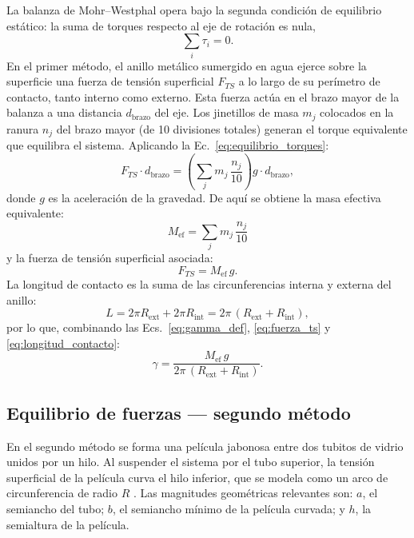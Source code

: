 La balanza de Mohr--Westphal opera bajo la segunda condición de equilibrio
estático: la suma de torques respecto al eje de rotación es nula,
\begin{equation}
    \sum_{i} \tau_i = 0.
    \label{eq:equilibrio_torques}
\end{equation}
En el primer método, el anillo metálico sumergido en agua ejerce sobre la
superficie una fuerza de tensión superficial $F_{TS}$ a lo largo de su
perímetro de contacto, tanto interno como externo. Esta fuerza actúa en el
brazo mayor de la balanza a una distancia $d_{\text{brazo}}$ del eje. Los
jinetillos de masa $m_j$ colocados en la ranura $n_j$ del brazo mayor (de 10
divisiones totales) generan el torque equivalente que equilibra el sistema.
Aplicando la Ec.~\eqref{eq:equilibrio_torques}:
\begin{equation}
    F_{TS} \cdot d_{\text{brazo}} =
    \left(\sum_{j} m_j \,\frac{n_j}{10}\right) g \cdot d_{\text{brazo}},
    \label{eq:torque_balance}
\end{equation}
donde $g$ es la aceleración de la gravedad. De aquí se obtiene la masa efectiva equivalente:
\begin{equation}
    M_{\text{ef}} = \sum_{j} m_j \,\frac{n_j}{10}
    \label{eq:masa_ef}
\end{equation}
y la fuerza de tensión superficial asociada:
\begin{equation}
    F_{TS} = M_{\text{ef}}\, g.
    \label{eq:fuerza_ts}
\end{equation}
La longitud de contacto es la suma de las circunferencias interna y externa del
anillo:
\begin{equation}
    L = 2\pi R_{\text{ext}} + 2\pi R_{\text{int}}
      = 2\pi\,(R_{\text{ext}} + R_{\text{int}}),
    \label{eq:longitud_contacto}
\end{equation}
por lo que, combinando las Ecs.~\eqref{eq:gamma_def},
\eqref{eq:fuerza_ts} y \eqref{eq:longitud_contacto}:
\begin{equation}
    \gamma = \frac{M_{\text{ef}}\,g}{2\pi\,(R_{\text{ext}} + R_{\text{int}})}.
    \label{eq:gamma_m1}
\end{equation}

\subsection{Equilibrio de fuerzas — segundo método}

En el segundo método se forma una película jabonosa entre dos tubitos de vidrio
unidos por un hilo. Al suspender el sistema por el tubo superior, la tensión
superficial de la película curva el hilo inferior, que se modela como un arco
de circunferencia de radio $R$ \cite{halliday}. Las magnitudes geométricas
relevantes son: $a$, el semiancho del tubo; $b$, el semiancho mínimo de la
película curvada; y $h$, la semialtura de la película. 

